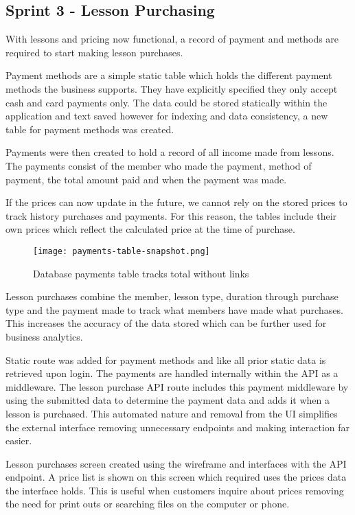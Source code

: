\subsection{Sprint 3 - Lesson Purchasing}
With lessons and pricing now functional, a record of payment and methods are required to start making lesson purchases.

Payment methods are a simple static table which holds the different payment methods the business supports. They have explicitly specified they only accept cash and card payments only. The data could be stored statically within the application and text saved however for indexing and data consistency, a new table for payment methods was created.

Payments were then created to hold a record of all income made from lessons. The payments consist of the member who made the payment, method of payment, the total amount paid and when the payment was made.

If the prices can now update in the future, we cannot rely on the stored prices to track history purchases and payments. For this reason, the tables include their own prices which reflect the calculated price at the time of purchase.

\begin{figure}[ht!]
    \centerline{\texttt{[image: payments-table-snapshot.png]}}
    \caption{Database payments table tracks total without links}
    \label{fig:payments-total}
\end{figure}

Lesson purchases combine the member, lesson type, duration through purchase type and the payment made to track what members have made what purchases. This increases the accuracy of the data stored which can be further used for business analytics.

Static route was added for payment methods and like all prior static data is retrieved upon login. The payments are handled internally within the API as a middleware. The lesson purchase API route includes this payment middleware by using the submitted data to determine the payment data and adds it when a lesson is purchased. This automated nature and removal from the UI simplifies the external interface removing unnecessary endpoints and making interaction far easier.

Lesson purchases screen created using the wireframe and interfaces with the API endpoint. A price list is shown on this screen which required uses the prices data the interface holds. This is useful when customers inquire about prices removing the need for print outs or searching files on the computer or phone.

